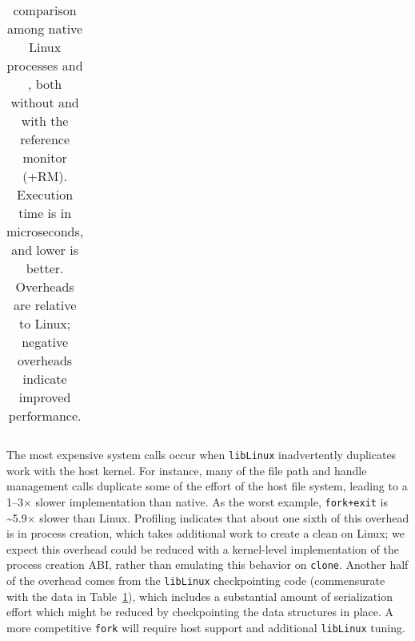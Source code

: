 \begin{table}[t!b!]
\begin{tabular}{|l|rr|rrr|rrr|rrr|}
\end{tabular}
\caption[\lmbench{} benchmarking results in Linux, KVM and \sysname{}]
{\lmbench{} comparison among native Linux processes
and \sysname{} \picoprocs{}, both without and with the reference monitor (+RM).
Execution time is in microseconds, and lower is better. 
Overheads are relative to Linux; negative overheads indicate improved performance. } 
\label{tab:graphene:lmbench}
\end{table}


The most expensive system calls occur when {\tt libLinux} inadvertently duplicates work
with the host kernel.  
For instance, many of the file path and handle management calls duplicate some of the effort of the host file system,
leading to a 1--3$\times$ slower implementation than native.
As the worst example,
{\tt fork+exit} is \~{}5.9$\times$ slower than Linux.
Profiling indicates that about one sixth of this overhead is in process creation, which 
takes additional work to create a clean \picoproc{} on Linux; we expect this overhead could be reduced
with a kernel-level implementation of the process creation ABI, rather than emulating this behavior on {\tt clone}.
Another half of the overhead comes from the
{\tt libLinux} checkpointing code (commensurate with the data in Table~\ref{tab:graphene:lmbench}), which 
includes a substantial amount of serialization effort which might be reduced by checkpointing the data structures in place.
A more competitive {\tt fork} will require host support and additional {\tt libLinux} tuning.

